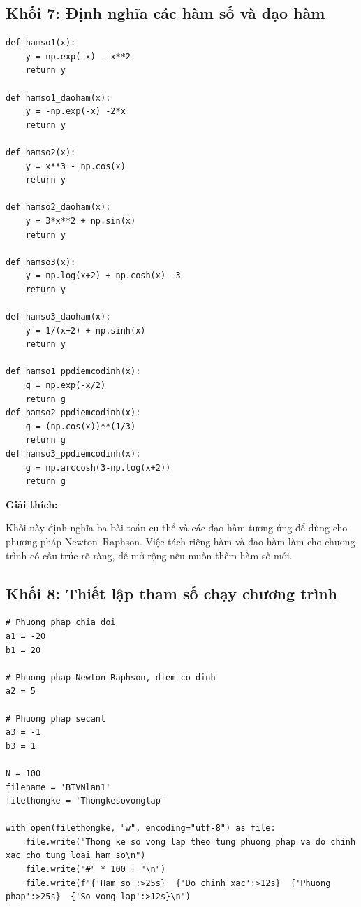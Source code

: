 \documentclass{article}
\begin{document}
\subsection{Khối 7: Định nghĩa các hàm số và đạo hàm}
\begin{lstlisting}[style=mypython,caption={Các hàm số khảo sát và đạo hàm tương ứng}]
def hamso1(x):
    y = np.exp(-x) - x**2
    return y

def hamso1_daoham(x):
    y = -np.exp(-x) -2*x
    return y

def hamso2(x):
    y = x**3 - np.cos(x)
    return y

def hamso2_daoham(x):
    y = 3*x**2 + np.sin(x)
    return y

def hamso3(x):
    y = np.log(x+2) + np.cosh(x) -3
    return y

def hamso3_daoham(x):
    y = 1/(x+2) + np.sinh(x)
    return y

def hamso1_ppdiemcodinh(x):
    g = np.exp(-x/2)
    return g
def hamso2_ppdiemcodinh(x):
    g = (np.cos(x))**(1/3)
    return g
def hamso3_ppdiemcodinh(x):
    g = np.arccosh(3-np.log(x+2))
    return g
\end{lstlisting}

\textbf{Giải thích:}

Khối này định nghĩa ba bài toán cụ thể và các đạo hàm tương ứng để dùng cho phương pháp Newton--Raphson. Việc tách riêng hàm và đạo hàm làm cho chương trình có cấu trúc rõ ràng, dễ mở rộng nếu muốn thêm hàm số mới.

\subsection{Khối 8: Thiết lập tham số chạy chương trình}
\begin{lstlisting}[style=mypython,caption={Khai báo tham số và chuẩn bị file thống kê}]
# Phuong phap chia doi
a1 = -20
b1 = 20

# Phuong phap Newton Raphson, diem co dinh
a2 = 5

# Phuong phap secant
a3 = -1
b3 = 1

N = 100
filename = 'BTVNlan1'
filethongke = 'Thongkesovonglap'

with open(filethongke, "w", encoding="utf-8") as file:
    file.write("Thong ke so vong lap theo tung phuong phap va do chinh xac cho tung loai ham so\n")
    file.write("#" * 100 + "\n")
    file.write(f"{'Ham so':>25s}  {'Do chinh xac':>12s}  {'Phuong phap':>25s}  {'So vong lap':>12s}\n")
\end{lstlisting}
\end{document}
